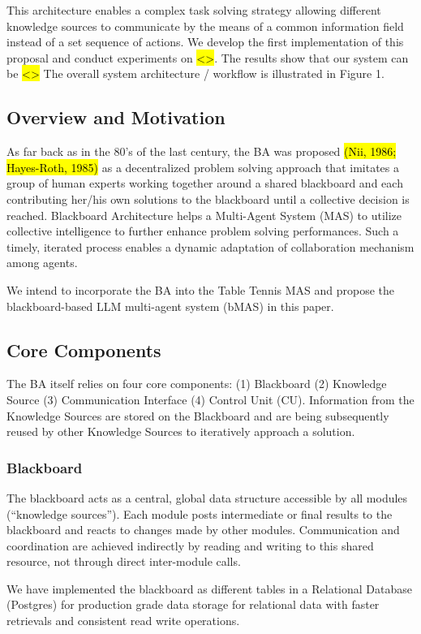 \documentclass[conference]{IEEEtran}
\begin{document}
This architecture enables a complex task solving strategy allowing different knowledge sources to communicate by the means of a common information field instead of a set sequence of actions. 
We develop the first implementation of this proposal and conduct experiments on \hl{<>}. The results show that our system can be \hl{<>}
The overall system architecture / workflow is illustrated in Figure 1.
\subsection{Overview and Motivation}
As far back as in the 80’s of the last century, the BA was proposed \hl{(Nii, 1986; Hayes-Roth, 1985)} as a decentralized problem solving approach that imitates a group of human experts working together around a shared blackboard and each contributing her/his own solutions to the blackboard until a collective decision is reached. 
Blackboard Architecture helps a Multi-Agent System (MAS) to utilize collective intelligence to further enhance problem solving performances. 
Such a timely, iterated process enables a dynamic adaptation of collaboration mechanism among agents.

We intend to incorporate the BA into the Table Tennis MAS and propose the blackboard-based LLM multi-agent system (bMAS) in this paper.
\subsection{Core Components}
The BA itself relies on four core components: (1) Blackboard (2) Knowledge Source (3) Communication Interface (4) Control Unit (CU). Information from the Knowledge Sources are stored on the Blackboard and are being subsequently reused by other Knowledge Sources to iteratively approach a solution. 
\subsubsection{Blackboard}
The blackboard acts as a central, global data structure accessible by all modules (“knowledge sources”).
Each module posts intermediate or final results to the blackboard and reacts to changes made by other modules.
Communication and coordination are achieved indirectly by reading and writing to this shared resource, not through direct inter-module calls.

We have implemented the blackboard as different tables in a Relational Database (Postgres) for production grade data storage for relational data with faster retrievals and consistent read write operations.
\end{document}
